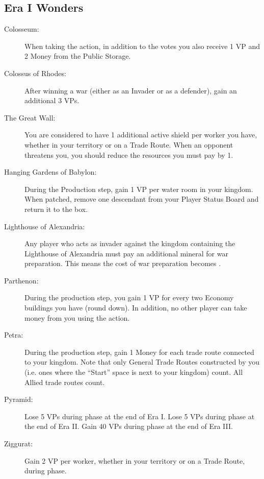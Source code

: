 \documentclass[10pt,twocolumn]{article}
\begin{document}
\begin{appendices}
\subsection{Era I Wonders}
\begin{description}
\item[Colosseum:] When taking the  action, in addition to the votes you also receive 1 VP and 2 Money from the Public Storage.
\item[Colossus of Rhodes:] After winning a war (either as an Invader or as a defender), gain an additional 3 VPs.
\item[The Great Wall:] You are considered to have 1 additional active shield per worker you have, whether in your territory or on a Trade Route. When an opponent threatens you, you should reduce the resources you must pay by 1.
\item[Hanging Gardens of Babylon:] During the Production step, gain 1 VP per water room in your kingdom. When patched, remove one descendant from your Player Status Board and return it to the box.
\item[Lighthouse of Alexandria:] Any player who acts as invader against the kingdom containing the Lighthouse of Alexandria must pay an additional mineral for war preparation. This means the cost of war preparation becomes .
\item[Parthenon:] During the production step, you gain 1 VP for every two Economy buildings you have (round down). In addition, no other player can take money from you using the  action.
\item[Petra:] During the production step, gain 1 Money for each trade route connected to your kingdom. Note that only General Trade Routes constructed by you (i.e. ones where the ``Start'' space is next to your kingdom) count. All Allied trade routes count.
\item[Pyramid:] Lose 5 VPs during  phase at the end of Era I. Lose 5 VPs during  phase at the end of Era II. Gain 40 VPs during  phase at the end of Era III.
\item[Ziggurat:] Gain 2 VP per worker, whether in your territory or on a Trade Route, during  phase.
\end{description}

\end{appendices}
\end{document}
